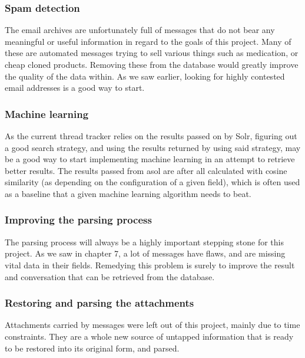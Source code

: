 \documentclass[a4paper,english]{report}
\begin{document}
\subsubsection{Spam detection} 
The email archives are unfortunately full of messages that do not bear any meaningful or useful information in regard to the goals of this project. Many of these are automated messages trying to sell various things such as medication, or cheap cloned products. Removing these from the database would greatly improve the quality of the data within. As we saw earlier, looking for highly contested email addresses is a good way to start.

\subsubsection{Machine learning}
As the current thread tracker relies on the results passed on by Solr, figuring out a good search strategy, and using the results returned by using said strategy, may be a good way to start implementing machine learning in an attempt to retrieve better results. The results passed from asol are after all calculated with cosine similarity (as depending on the configuration of a given field), which is often used as a baseline that a given machine learning algorithm needs to beat.  

\subsubsection{Improving the parsing process}
The parsing process will always be a highly important stepping stone for this project. As we saw in chapter 7, a lot of messages have flaws, and are missing vital data in their fields. Remedying this problem is surely to improve the result and conversation that can be retrieved from the database.

\subsubsection{Restoring and parsing the attachments}
Attachments carried by messages were left out of this project, mainly due to time constraints. They are a whole new source of untapped information that is ready to be restored into its original form, and parsed.
\end{document}
